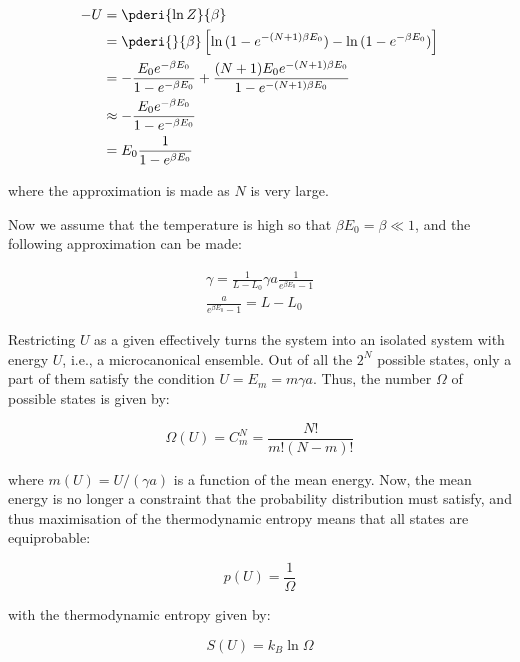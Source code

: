 \documentclass[12pt]{article}
\begin{document}
\begin{equation}
\begin{split}
-U &= \pderi{\ln{Z}}{\beta} \\
   &= \pderi{}{\beta} \left[ \ln{(1 - e^{-(N+1)\beta E_{0}})} - \ln{(1 - e^{-\beta E_{0}})} \right] \\
   &= - \frac{E_{0} e^{-\beta E_{0}}}{1 - e^{-\beta E_{0}}} + \frac{(N+1)E_{0} e^{-(N+1)\beta E_{0}}}{1 - e^{-(N+1)\beta E_{0}}} \\
   &\approx - \frac{E_{0} e^{-\beta E_{0}}}{1 - e^{-\beta E_{0}}} \\
   &= E_{0} \frac{1}{1 - e^{\beta E_{0}}}
\end{split}
\end{equation}

where the approximation is made as $N$ is very large.

Now we assume that the temperature is high so that $\beta E_{0} = \beta \ll 1$, and the following approximation can be made:

\begin{equation}
\begin{split}
\gamma = \frac{1}{L - L_{0}} \gamma a \frac{1}{e^{\beta E_{0}} - 1} \\
\frac{a}{e^{\beta E_{0}} - 1} = L - L_{0}
\end{split}
\end{equation}

Restricting $U$ as a given effectively turns the system into an isolated system with energy $U$, i.e., a microcanonical ensemble. Out of all the $2^{N}$ possible states, only a part of them satisfy the condition $U = E_{m} = m \gamma a$. Thus, the number $\Omega$ of possible states is given by:

\begin{equation}
\Omega(U) = C_{m}^{N} = \frac{N!}{m!(N-m)!}
\end{equation}

where $m(U) = U/(\gamma a)$ is a function of the mean energy. Now, the mean energy is no longer a constraint that the probability distribution must satisfy, and thus maximisation of the thermodynamic entropy means that all states are equiprobable:

\begin{equation}
p(U) = \frac{1}{\Omega}
\end{equation}

with the thermodynamic entropy given by:

\begin{equation}
S(U) = k_{B} \ln{\Omega}
\end{equation}
\end{document}
